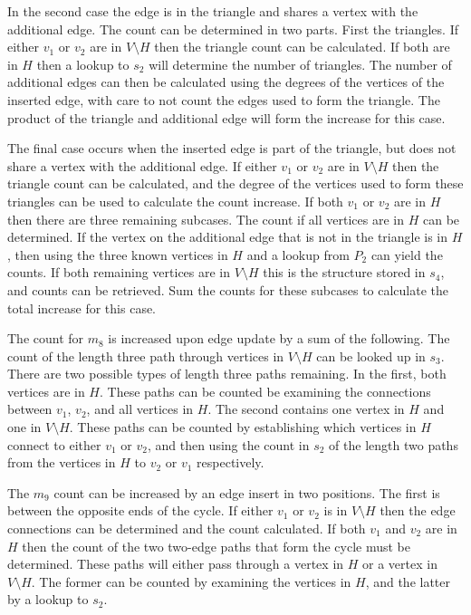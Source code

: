 \documentclass[11pt]{article}
\begin{document}
In the second case the edge is in the triangle and shares a vertex with the additional edge.  The count can be determined in two parts.  First the triangles.  If either $v_1$ or $v_2$ are in $V \setminus H$ then the triangle count can be calculated.  If both are in $H$ then a lookup to $s_2$ will determine the number of triangles. The number of additional edges can then be calculated using the degrees of the vertices of the inserted edge, with care to not count the edges used to form the triangle.  The product of the triangle and additional edge will form the increase for this case.

The final case occurs when the inserted edge is part of the triangle, but does not share a vertex with the additional edge. If either $v_1$ or $v_2$ are in $V \setminus H$ then the triangle count can be calculated, and the degree of the vertices used to form these triangles can be used to calculate the count increase.  If both  $v_1$ or $v_2$ are in $H$ then there are three remaining subcases.  The count if all vertices are in $H$ can be determined.  If the vertex on the additional edge that is not in the triangle is in $H$, then using the three known vertices in $H$ and a lookup from $P_2$ can yield the counts.  If both remaining vertices are in $V \setminus H$ this is the structure stored in $s_4$, and counts can be retrieved.  Sum the counts for these subcases to calculate the total increase for this case.


The count for $m_8$ is increased upon edge update by a sum of the following.  The count of the length three path through vertices in $V \setminus H$ can be looked up in $s_3$.  There are two possible types of length three paths remaining.  In the first, both vertices are in $H$.  These paths can be counted be examining the connections between $v_1$, $v_2$, and all vertices in $H$.  The second contains one vertex in $H$ and one in $V \setminus H$. These paths can be counted by establishing which vertices in $H$ connect to either $v_1$ or $v_2$, and then using the count in $s_2$ of the length two paths from the vertices in $H$ to $v_2$ or $v_1$ respectively.



The $m_9$ count can be increased by an edge insert in two positions.  The first is between the opposite ends of the cycle.  If either $v_1$ or $v_2$ is in $V \setminus H$ then the edge connections can be determined and the count calculated.  If both $v_1$ and $v_2$ are in $H$ then the count of the two two-edge paths that form the cycle must be determined.  These paths will either pass through a vertex in $H$ or a vertex in $V \setminus H$.  The former can be counted by examining the vertices in $H$, and the latter by a lookup to $s_2$.
\end{document}

